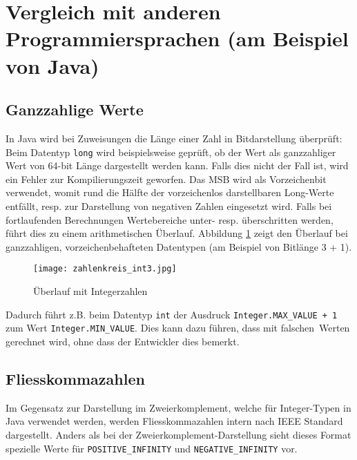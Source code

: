 \documentclass[10pt, a4paper, twocolumn]{article} %
\begin{document}
\section{Vergleich mit anderen Programmiersprachen (am Beispiel von Java)}
\subsection{Ganzzahlige Werte}
In Java wird bei Zuweisungen die Länge einer Zahl in Bitdarstellung überprüft:
Beim Datentyp \texttt{long} wird beispielsweise geprüft, ob der Wert als ganzzahliger Wert von 64-bit Länge dargestellt werden kann.
Falls dies nicht der Fall ist, wird ein Fehler zur Kompilierungszeit geworfen.
Das MSB wird als Vorzeichenbit verwendet, womit rund die Hälfte der vorzeichenlos darstellbaren Long-Werte entfällt, resp. zur Darstellung von negativen Zahlen eingesetzt wird.
Falls bei fortlaufenden Berechnungen Wertebereiche unter- resp. überschritten werden, führt dies zu einem arithmetischen Überlauf.
Abbildung \ref{zahlenkreis} %
zeigt den Überlauf bei ganzzahligen, vorzeichenbehafteten Datentypen (am Beispiel von Bitlänge 3 + 1).

\begin{figure}[H]
    \texttt{[image: zahlenkreis\_int3.jpg]} %
    \caption{Überlauf mit Integerzahlen } %
    \label{zahlenkreis}
\end{figure}


Dadurch führt z.B. beim Datentyp \texttt{int} der Ausdruck \texttt{Integer.MAX\_VALUE + 1} zum Wert \texttt{Integer.MIN\_VALUE}.
Dies kann dazu führen, dass mit \glqq falschen\grqq \ Werten gerechnet wird, ohne dass der Entwickler dies bemerkt.

\subsection{Fliesskommazahlen}
Im Gegensatz zur Darstellung im Zweierkomplement, welche für Integer-Typen in Java verwendet werden, werden Fliesskommazahlen intern nach IEEE Standard dargestellt.
Anders als bei der Zweierkomplement-Darstellung sieht dieses Format spezielle Werte für \texttt{POSITIVE\_INFINITY} und \texttt{NEGATIVE\_INFINITY} vor.
\end{document}
